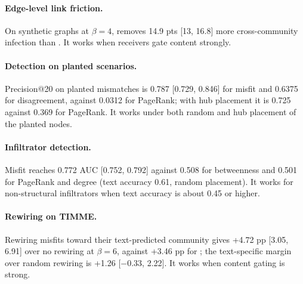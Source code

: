 \paragraph{Edge-level link friction.}
On synthetic graphs at $\beta{=}4$,  removes 14.9 pts [13, 16.8] more cross-community infection than . It works when receivers gate content strongly.

\paragraph{Detection on planted scenarios.}
Precision@20 on planted mismatches is 0.787 [0.729, 0.846] for misfit and 0.6375 for disagreement, against 0.0312 for PageRank; with hub placement it is 0.725 against 0.369 for PageRank. It works under both random and hub placement of the planted nodes.

\paragraph{Infiltrator detection.}
Misfit reaches 0.772 AUC [0.752, 0.792] against 0.508 for betweenness and 0.501 for PageRank and degree (text accuracy 0.61, random placement). It works for non-structural infiltrators when text accuracy is about 0.45 or higher.

\paragraph{Rewiring on TIMME.}
Rewiring misfits toward their text-predicted community gives +4.72 pp [3.05, 6.91] over no rewiring at $\beta{=}6$, against +3.46 pp for ; the text-specific margin over random rewiring is +1.26 [$-$0.33, 2.22]. It works when content gating is strong.
